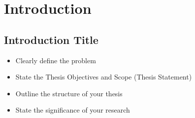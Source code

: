 \chapter{Introduction}

\section{Introduction Title}
\begin{itemize}
  \item Clearly define the problem
  \item State the Thesis Objectives and Scope (Thesis Statement)
  \item Outline the structure of your thesis
  \item State the significance of your research
\end{itemize}

